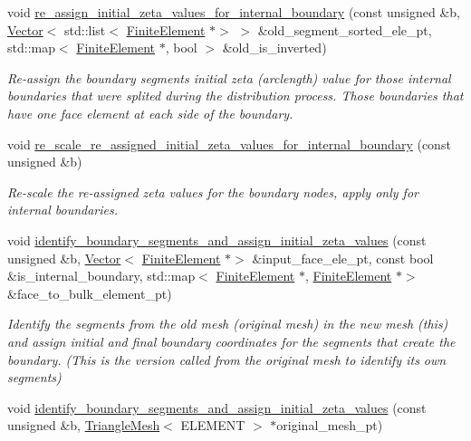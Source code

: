 \begin{DoxyCompactItemize}
void \hyperlink{classoomph_1_1TriangleMesh_a614bf8ce3f64b37924a0b02fc5bab8eb}{re\+\_\+assign\+\_\+initial\+\_\+zeta\+\_\+values\+\_\+for\+\_\+internal\+\_\+boundary} (const unsigned \&b, \hyperlink{classoomph_1_1Vector}{Vector}$<$ std\+::list$<$ \hyperlink{classoomph_1_1FiniteElement}{Finite\+Element} $\ast$$>$ $>$ \&old\+\_\+segment\+\_\+sorted\+\_\+ele\+\_\+pt, std\+::map$<$ \hyperlink{classoomph_1_1FiniteElement}{Finite\+Element} $\ast$, bool $>$ \&old\+\_\+is\+\_\+inverted)
\begin{DoxyCompactList}\small\item\em Re-\/assign the boundary segments initial zeta (arclength) value for those internal boundaries that were splited during the distribution process. Those boundaries that have one face element at each side of the boundary. \end{DoxyCompactList}\item 
void \hyperlink{classoomph_1_1TriangleMesh_a6a33a04b552311d9c9c258fa40e262de}{re\+\_\+scale\+\_\+re\+\_\+assigned\+\_\+initial\+\_\+zeta\+\_\+values\+\_\+for\+\_\+internal\+\_\+boundary} (const unsigned \&b)
\begin{DoxyCompactList}\small\item\em Re-\/scale the re-\/assigned zeta values for the boundary nodes, apply only for internal boundaries. \end{DoxyCompactList}\item 
void \hyperlink{classoomph_1_1TriangleMesh_ad71f798646dfcbe8baa991e540381cde}{identify\+\_\+boundary\+\_\+segments\+\_\+and\+\_\+assign\+\_\+initial\+\_\+zeta\+\_\+values} (const unsigned \&b, \hyperlink{classoomph_1_1Vector}{Vector}$<$ \hyperlink{classoomph_1_1FiniteElement}{Finite\+Element} $\ast$$>$ \&input\+\_\+face\+\_\+ele\+\_\+pt, const bool \&is\+\_\+internal\+\_\+boundary, std\+::map$<$ \hyperlink{classoomph_1_1FiniteElement}{Finite\+Element} $\ast$, \hyperlink{classoomph_1_1FiniteElement}{Finite\+Element} $\ast$$>$ \&face\+\_\+to\+\_\+bulk\+\_\+element\+\_\+pt)
\begin{DoxyCompactList}\small\item\em Identify the segments from the old mesh (original mesh) in the new mesh (this) and assign initial and final boundary coordinates for the segments that create the boundary. (This is the version called from the original mesh to identify its own segments) \end{DoxyCompactList}\item 
void \hyperlink{classoomph_1_1TriangleMesh_ad79adab8a5da9c9fff26bfeeb019f102}{identify\+\_\+boundary\+\_\+segments\+\_\+and\+\_\+assign\+\_\+initial\+\_\+zeta\+\_\+values} (const unsigned \&b, \hyperlink{classoomph_1_1TriangleMesh}{Triangle\+Mesh}$<$ E\+L\+E\+M\+E\+NT $>$ $\ast$original\+\_\+mesh\+\_\+pt)
$$
\end{DoxyCompactItemize}
